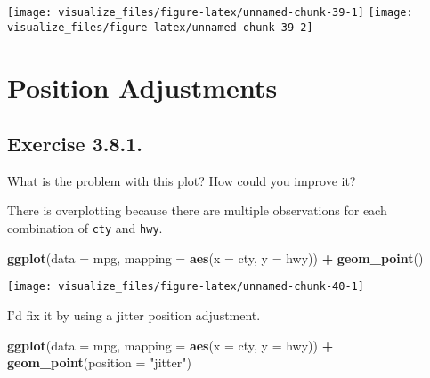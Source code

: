 \documentclass[]{book}
\newenvironment{Shaded}{\begin{snugshade}}{\end{snugshade}}
\newcommand{\DataTypeTok}[1]{\textcolor[rgb]{0.13,0.29,0.53}{#1}}
\newcommand{\KeywordTok}[1]{\textcolor[rgb]{0.13,0.29,0.53}{\textbf{#1}}}
\newcommand{\NormalTok}[1]{#1}
\newcommand{\OperatorTok}[1]{\textcolor[rgb]{0.81,0.36,0.00}{\textbf{#1}}}
\newcommand{\StringTok}[1]{\textcolor[rgb]{0.31,0.60,0.02}{#1}}
\theoremstyle{plain}
\theoremstyle{remark}
\theoremstyle{definition}
\theoremstyle{definition}
\theoremstyle{definition}
\theoremstyle{remark}
\begin{document}
\begin{center}\texttt{[image: visualize\_files/figure-latex/unnamed-chunk-39-1]} \texttt{[image: visualize\_files/figure-latex/unnamed-chunk-39-2]} \end{center}

\hypertarget{position-adjustments}{%
\section{Position Adjustments}\label{position-adjustments}}

\hypertarget{exercise-3.8.1.}{%
\subsection*{\texorpdfstring{Exercise
{3.8.1}.}{Exercise 3.8.1.}}\label{exercise-3.8.1.}}

What is the problem with this plot? How could you improve it?

There is overplotting because there are multiple observations for each
combination of \texttt{cty} and \texttt{hwy}.

\begin{Shaded}
\begin{Highlighting}[]
\KeywordTok{ggplot}\NormalTok{(}\DataTypeTok{data =}\NormalTok{ mpg, }\DataTypeTok{mapping =} \KeywordTok{aes}\NormalTok{(}\DataTypeTok{x =}\NormalTok{ cty, }\DataTypeTok{y =}\NormalTok{ hwy)) }\OperatorTok{+}
\StringTok{  }\KeywordTok{geom_point}\NormalTok{()}
\end{Highlighting}
\end{Shaded}

\begin{center}\texttt{[image: visualize\_files/figure-latex/unnamed-chunk-40-1]} \end{center}

I'd fix it by using a jitter position adjustment.

\begin{Shaded}
\begin{Highlighting}[]
\KeywordTok{ggplot}\NormalTok{(}\DataTypeTok{data =}\NormalTok{ mpg, }\DataTypeTok{mapping =} \KeywordTok{aes}\NormalTok{(}\DataTypeTok{x =}\NormalTok{ cty, }\DataTypeTok{y =}\NormalTok{ hwy)) }\OperatorTok{+}
\StringTok{  }\KeywordTok{geom_point}\NormalTok{(}\DataTypeTok{position =} \StringTok{"jitter"}\NormalTok{)}
\end{Highlighting}
\end{Shaded}
\end{document}
